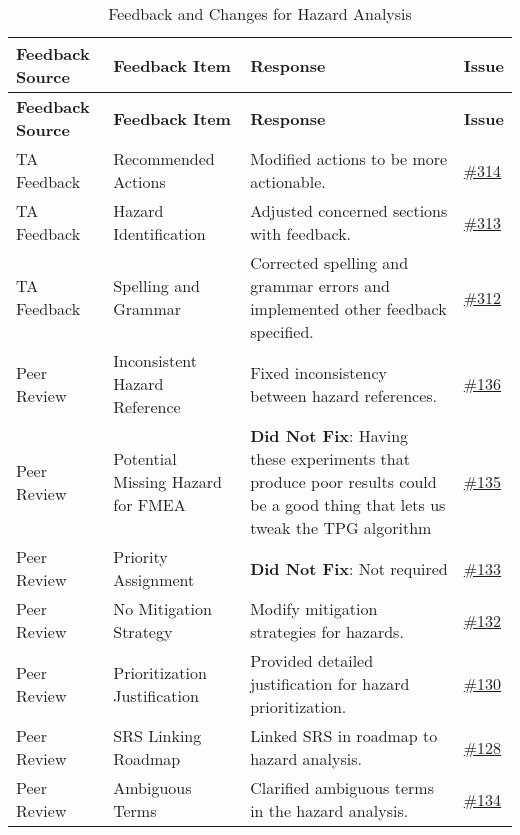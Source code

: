 \documentclass{article}
\begin{document}
\begin{longtable}{| p{} | p{} | p{} | p{} |}
    \caption{Feedback and Changes for Hazard Analysis} \\
    \hline
    \textbf{Feedback Source} & \textbf{Feedback Item} & \textbf{Response} & \textbf{Issue} \\
    \hline
    \endfirsthead
    \hline
    \textbf{Feedback Source} & \textbf{Feedback Item} & \textbf{Response} & \textbf{Issue} \\
    \hline
    \endhead
    \hline
    \endfoot
    TA Feedback & Recommended Actions & Modified actions to be more actionable. & \href{https://github.com/TPGEngine/tpg/issues/314}{\#314} \\
    \hline
    TA Feedback & Hazard Identification & Adjusted concerned sections with feedback. & \href{https://github.com/TPGEngine/tpg/issues/313}{\#313} \\
    \hline
    TA Feedback & Spelling and Grammar & Corrected spelling and grammar errors and implemented other feedback specified. & \href{https://github.com/TPGEngine/tpg/issues/312}{\#312} \\
    \hline
    Peer Review & Inconsistent Hazard Reference & Fixed inconsistency between hazard references. & \href{https://github.com/TPGEngine/tpg/issues/136}{\#136} \\
    \hline
    Peer Review & Potential Missing Hazard for FMEA & \textbf{Did Not Fix}: Having these experiments that produce poor results could be a good thing that lets us tweak the TPG algorithm  & \href{https://github.com/TPGEngine/tpg/issues/135}{\#135} \\
    \hline
    Peer Review & Priority Assignment & \textbf{Did Not Fix}: Not required & \href{https://github.com/TPGEngine/tpg/issues/133}{\#133} \\
    \hline
    Peer Review & No Mitigation Strategy & Modify mitigation strategies for hazards. & \href{https://github.com/TPGEngine/tpg/issues/132}{\#132} \\
    \hline
    Peer Review & Prioritization Justification & Provided detailed justification for hazard prioritization. & \href{https://github.com/TPGEngine/tpg/issues/130}{\#130} \\
    \hline
    Peer Review & SRS Linking Roadmap & Linked SRS in roadmap to hazard analysis. & \href{https://github.com/TPGEngine/tpg/issues/128}{\#128} \\
    \hline
    Peer Review & Ambiguous Terms & Clarified ambiguous terms in the hazard analysis. & \href{https://github.com/TPGEngine/tpg/issues/134}{\#134} \\
    \hline
\end{longtable}
\end{document}
